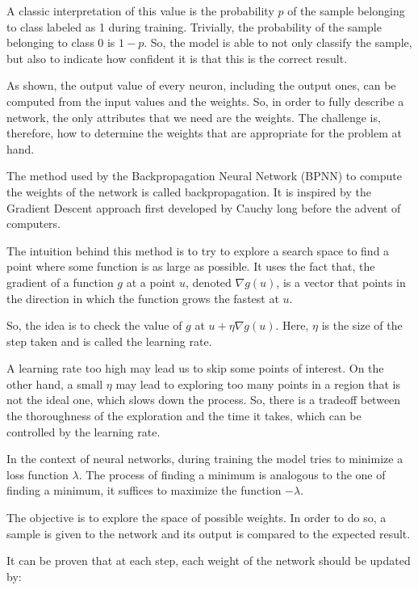 A classic interpretation of this value is the probability $p$ of the sample belonging to class labeled as 1 during training.
Trivially, the probability of the sample belonging to class 0 is $1-p$.
So, the model is able to not only classify the sample, but also to indicate how confident it is that this is the correct result.

As shown, the output value of every neuron, including the output ones, can be computed from the input values and the weights.
So, in order to fully describe a network, the only attributes that we need are the weights.
The challenge is, therefore, how to determine the weights that are appropriate for the problem at hand.

The method used by the Backpropagation Neural Network (BPNN) to compute the weights of the network is called backpropagation.
It is inspired by the Gradient Descent approach first developed by Cauchy \cite{lemarechal2012cauchy} long before the advent of computers.

The intuition behind this method is to try to explore a search space to find a point where some function is as large as possible.
It uses the fact that, the gradient of a function $g$ at a point $u$, denoted $\nabla g(u)$, is a vector that points in the direction in which the function grows the fastest at $u$.

So, the idea is to check the value of $g$ at $u + \eta \nabla g(u)$.
Here, $\eta$ is the size of the step taken and is called the learning rate.

A learning rate too high may lead us to skip some points of interest.
On the other hand, a small $\eta$ may lead to exploring too many points in a region that is not the ideal one, which slows down the process.
So, there is a tradeoff between the thoroughness of the exploration and the time it takes, which can be controlled by the learning rate.

In the context of neural networks, during training the model tries to minimize a loss function $\lambda$.
The process of finding a minimum is analogous to the one of finding a minimum, it suffices to maximize the function $-\lambda$.

The objective is to explore the space of possible weights.
In order to do so, a sample is given to the network and its output is compared to the expected result.

It can be proven \cite{amari1993backpropagation} that at each step, each weight of the network should be updated by:

